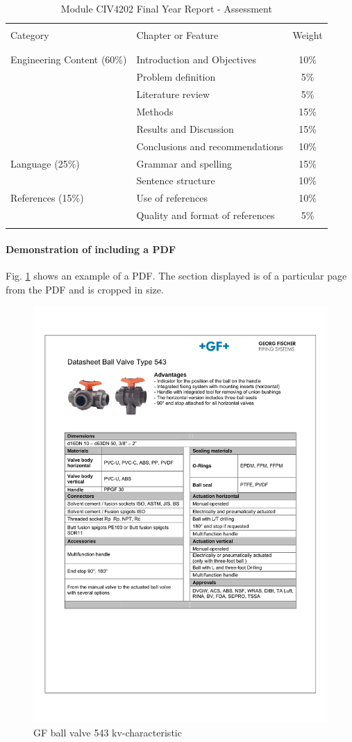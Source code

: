 \begin{table}
	\begin{center}
		\caption{\label{tbl:ModuleWeight}Module CIV4202 Final Year Report - Assessment}
		\begin{tabular}{llc}
			\hline \\
			Category					& Chapter or Feature				& Weight \\
			\\
			\hline \\
			Engineering Content (60\%)	& Introduction and Objectives		& 10\%   \\
										& Problem definition				& 5\%    \\
										& Literature review					& 5\%    \\
										& Methods							& 15\%   \\
										& Results and Discussion			& 15\%   \\
										& Conclusions and recommendations	& 10\%   \\
			Language (25\%)				& Grammar and spelling				& 15\%   \\
										& Sentence structure				& 10\%   \\
			References (15\%)			& Use of references					& 10\%   \\
										& Quality and format of references	& 5\%    \\
			\hline \\
		\end{tabular}
	\end{center}
\end{table}

\paragraph{Demonstration of including a PDF}
Fig. \ref{fig:GF543kv} shows an example of a PDF. The section displayed is of a particular page from the PDF and is cropped in size.
\begin{figure}
	\centering
	\includegraphics[height=0.7\textwidth,page=6, trim = 25mm 172mm 25mm 45mm, clip]{600-Appendices/Examples/Datasheet_GF_543}
	\caption{GF ball valve 543 kv-characteristic}
	\label{fig:GF543kv}
\end{figure}


